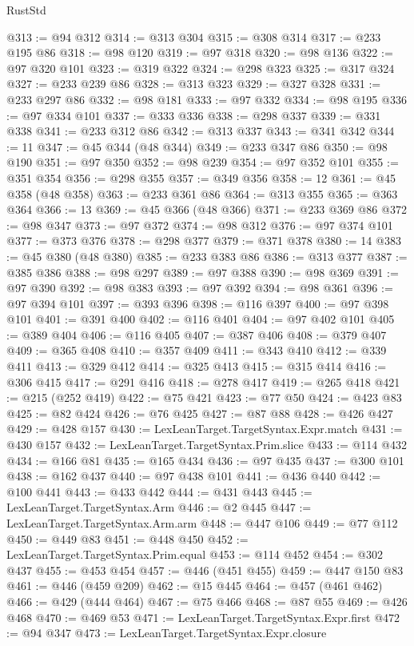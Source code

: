 \begin{lexlean}{RustStd}
\begin{coremodule}
@313 := @94 @312
@314 := @313 @304
@315 := @308 @314
@317 := @233 @195 @86
@318 := @98 @120
@319 := @97 @318
@320 := @98 @136
@322 := @97 @320 @101
@323 := @319 @322
@324 := @298 @323
@325 := @317 @324
@327 := @233 @239 @86
@328 := @313 @323
@329 := @327 @328
@331 := @233 @297 @86
@332 := @98 @181
@333 := @97 @332
@334 := @98 @195
@336 := @97 @334 @101
@337 := @333 @336
@338 := @298 @337
@339 := @331 @338
@341 := @233 @312 @86
@342 := @313 @337
@343 := @341 @342
@344 := 11
@347 := @45 @344 (@48 @344)
@349 := @233 @347 @86
@350 := @98 @190
@351 := @97 @350
@352 := @98 @239
@354 := @97 @352 @101
@355 := @351 @354
@356 := @298 @355
@357 := @349 @356
@358 := 12
@361 := @45 @358 (@48 @358)
@363 := @233 @361 @86
@364 := @313 @355
@365 := @363 @364
@366 := 13
@369 := @45 @366 (@48 @366)
@371 := @233 @369 @86
@372 := @98 @347
@373 := @97 @372
@374 := @98 @312
@376 := @97 @374 @101
@377 := @373 @376
@378 := @298 @377
@379 := @371 @378
@380 := 14
@383 := @45 @380 (@48 @380)
@385 := @233 @383 @86
@386 := @313 @377
@387 := @385 @386
@388 := @98 @297
@389 := @97 @388
@390 := @98 @369
@391 := @97 @390
@392 := @98 @383
@393 := @97 @392
@394 := @98 @361
@396 := @97 @394 @101
@397 := @393 @396
@398 := @116 @397
@400 := @97 @398 @101
@401 := @391 @400
@402 := @116 @401
@404 := @97 @402 @101
@405 := @389 @404
@406 := @116 @405
@407 := @387 @406
@408 := @379 @407
@409 := @365 @408
@410 := @357 @409
@411 := @343 @410
@412 := @339 @411
@413 := @329 @412
@414 := @325 @413
@415 := @315 @414
@416 := @306 @415
@417 := @291 @416
@418 := @278 @417
@419 := @265 @418
@421 := @215 (@252 @419)
@422 := @75 @421
@423 := @77 @50
@424 := @423 @83
@425 := @82 @424
@426 := @76 @425
@427 := @87 @88
@428 := @426 @427
@429 := @428 @157
@430 := LexLeanTarget.TargetSyntax.Expr.match
@431 := @430 @157
@432 := LexLeanTarget.TargetSyntax.Prim.slice
@433 := @114 @432
@434 := @166 @81
@435 := @165 @434
@436 := @97 @435
@437 := @300 @101
@438 := @162 @437
@440 := @97 @438 @101
@441 := @436 @440
@442 := @100 @441
@443 := @433 @442
@444 := @431 @443
@445 := LexLeanTarget.TargetSyntax.Arm
@446 := @2 @445
@447 := LexLeanTarget.TargetSyntax.Arm.arm
@448 := @447 @106
@449 := @77 @112
@450 := @449 @83
@451 := @448 @450
@452 := LexLeanTarget.TargetSyntax.Prim.equal
@453 := @114 @452
@454 := @302 @437
@455 := @453 @454
@457 := @446 (@451 @455)
@459 := @447 @150 @83
@461 := @446 (@459 @209)
@462 := @15 @445
@464 := @457 (@461 @462)
@466 := @429 (@444 @464)
@467 := @75 @466
@468 := @87 @55
@469 := @426 @468
@470 := @469 @53
@471 := LexLeanTarget.TargetSyntax.Expr.first
@472 := @94 @347
@473 := LexLeanTarget.TargetSyntax.Expr.closure

\end{coremodule}
\end{lexlean}

